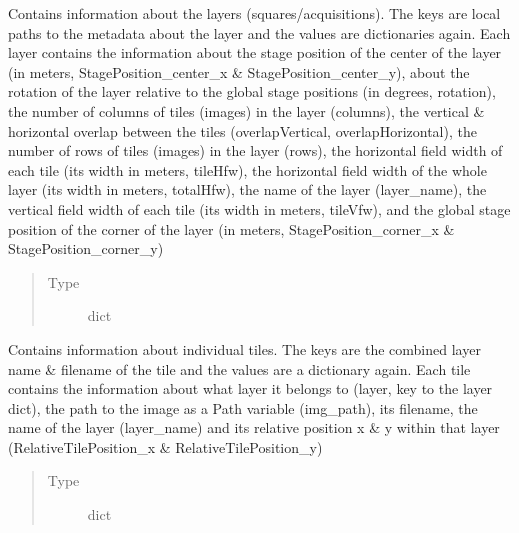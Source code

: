 \documentclass[letterpaper,10pt,english]{sphinxmanual}
\begin{document}
\begin{fulllineitems}
\begin{fulllineitems}
\label{\detokenize{index:sites_of_interest_parser.MapsXmlParser.layers}}
Contains information about the layers (squares/acquisitions). The keys are local paths to
the metadata about the layer and the values are dictionaries again. Each layer contains the information
about the stage position of the center of the layer (in meters, StagePosition\_center\_x \&
StagePosition\_center\_y), about the rotation of the layer relative to the global stage positions (in degrees,
rotation), the number of columns of tiles (images) in the layer (columns), the vertical \& horizontal overlap
between the tiles (overlapVertical, overlapHorizontal), the number of rows of tiles (images) in the layer
(rows), the horizontal field width of each tile (its width in meters, tileHfw), the horizontal field width
of the whole layer (its width in meters, totalHfw), the name of the layer (layer\_name), the vertical field
width of each tile (its width in meters, tileVfw), and the global stage position of the corner of the layer
(in meters, StagePosition\_corner\_x \& StagePosition\_corner\_y)
\begin{quote}\begin{description}
\item[{Type}] \leavevmode
dict

\end{description}\end{quote}

\end{fulllineitems}


\begin{fulllineitems}
\label{\detokenize{index:sites_of_interest_parser.MapsXmlParser.tiles}}
Contains information about individual tiles. The keys are the combined layer name \& filename of
the tile and the values are a dictionary again. Each tile contains the information about what layer it
belongs to (layer, key to the layer dict), the path to the image as a Path variable (img\_path), its
filename, the name of the layer (layer\_name) and its relative position x \& y within that layer
(RelativeTilePosition\_x \& RelativeTilePosition\_y)
\begin{quote}\begin{description}
\item[{Type}] \leavevmode
dict


\end{description}
\end{quote}
\end{fulllineitems}
\end{fulllineitems}
\end{document}
